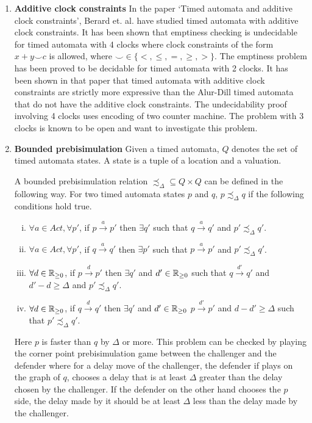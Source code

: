 \begin{enumerate}
\item \textbf{Additive clock constraints} In the paper `Timed automata and additive clock constraints', Berard et. al. have studied timed automata with additive clock constraints. It has been shown that emptiness checking is undecidable for timed automata with 4 clocks where clock constraints of the form $x + y \smile c$ is allowed, where $\smile \in \{<, \le, =, \ge, >\}$. The emptiness problem has been proved to be decidable for timed automata with 2 clocks. It has been shown in that paper that timed automata with additive clock constraints are strictly  more expressive than the Alur-Dill timed automata that do not have the additive clock constraints. The undecidability proof involving 4 clocks uses encoding of two counter machine. The problem with 3 clocks is known to be open and want to investigate this problem.

\item \textbf{Bounded prebisimulation} 
Given a timed automata, $Q$ denotes the set of timed automata states. A state is  a tuple of a location and a valuation.
\begin{definition}
A bounded prebisimulation relation $\precsim_{\Delta} \subseteq Q \times Q$ can be defined in the following way. For two timed automata states $p$ and $q$, $p \precsim_{\Delta} q$ if the following conditions hold true.
\begin{enumerate}[(i)]
\item $\forall a \in Act, \forall p'$, if $p \stackrel{a}{\rightarrow} p'$ then $\exists q'$ such that $q \stackrel{a}{\rightarrow} q'$ and $p' \precsim_{\Delta} q'$.
\item $\forall a \in Act, \forall p'$, if $q \stackrel{a}{\rightarrow} q'$ then $\exists p'$ such that  $p \stackrel{a}{\rightarrow} p'$ and $p' \precsim_{\Delta} q'$.
\item $\forall d \in \mathbb{R}_{\ge 0}$, if $p \stackrel{d}{\rightarrow} p'$ then $\exists q'$ and $d' \in \mathbb{R}_{\ge 0}$ such that $q \stackrel{d'}{\rightarrow} q'$ and $d' - d \ge \Delta$ and $p' \precsim_{\Delta} q'$.
\item $\forall d \in \mathbb{R}_{\ge 0}$, if $q \stackrel{d}{\rightarrow} q'$ then $\exists q'$ and $d' \in \mathbb{R}_{\ge 0}$  $p \stackrel{d'}{\rightarrow} p'$ and $d - d' \ge \Delta$ such that $p' \precsim_{\Delta} q'$.
\end{enumerate}
\end{definition}
Here $p$ is faster than $q$ by $\Delta$ or more. This problem can be checked by playing the corner point prebisimulation game between the challenger and the defender where for a delay move of the challenger, the defender if plays on the graph of $q$, chooses a delay that is at least $\Delta$ greater than the delay chosen by the challenger. If the defender on the other hand chooses the $p$ side, the delay made by it should be at least $\Delta$ less than the delay made by the challenger.


\end{enumerate}
